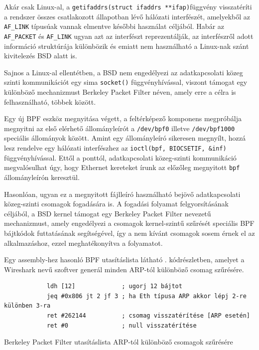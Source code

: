 \documentclass[a4paper,12pt]{article}
\begin{document}
	Akár csak Linux-al, a \texttt{getifaddrs(struct ifaddrs **ifap)}függvény visszatéríti a rendszer összes csatlakozott állapotban lévő hálózati interfészét, amelyekből az \texttt{AF_LINK} típusúak vannak elmentve későbbi használat céljából. Habár az \texttt{AF_PACKET} és \texttt{AF_LINK} ugyan azt az interfészt reprezentálják, az interfészről adott információ struktúrája különbözik és emiatt nem használható a Linux-nak szánt kivitelezés BSD alatt is.
	
	Sajnos a Linux-al ellentétben, a BSD nem engedélyezi az adatkapcsolati közeg szinti kommunikációt egy sima  \texttt{socket()} függvényhívással, viszont támogat egy különböző mechanizmust Berkeley Packet Filter néven, amely erre a célra is felhasználható, többek között.
	
	Egy új BPF eszköz megnyitása végett, a feltérképező komponens megpróbálja megnyitni az első elérhető állományleírót a \texttt{/dev/bpf0} illetve \texttt{/dev/bpf1000} speciális állományok között. Amint egy állományleíró sikeresen megnyílt, hozzá lesz rendelve egy hálózati interfészhez az \texttt{ioctl(bpf, BIOCSETIF, &inf)} függvényhívással. Ettől a ponttól, adatkapcsolati közeg-szinti kommunikáció megvalósulhat úgy, hogy Ethernet kereteket írunk az előzőleg megnyitott \texttt{bpf} állományleírón keresztül.
	
	Hasonlóan, ugyan ez a megnyitott fájlleíró használható bejövő adatkapcsolati közeg-szinti csomagok fogadására is. A fogadási folyamat felgyorsításának céljából, a BSD kernel támogat egy Berkeley Packet Filter nevezetű mechanizmust, amely engedélyezi a csomagok kernel-szintű szűrését speciális BPF bájtkódok futtatásának segítségével, így a nem kívánt csomagok sosem érnek el az alkalmazáshoz, ezzel meghatékonyítva a folyamatot.
	
	Egy assembly-hez hasonló BPF utasításlista látható \az{\ref{bpfasm}}. kódrészletben, amelyet a Wireshark nevű szoftver generál minden ARP-tól különböző csomag szűrésére.
	
	\begin{listing}[H]
		\begin{verbatim}
			ldh [12]             ; ugorj 12 bájtot
			jeq #0x806 jt 2 jf 3 ; ha Eth típusa ARP akkor lépj 2-re különben 3-ra
			ret #262144          ; csomag visszatérítése [ARP esetén]
			ret #0               ; null visszatérítése
		\end{verbatim}
		\caption{Berkeley Packet Filter utasításlista ARP-tól különböző csomagok szűrésére}
		\label{bpfasm}
	\end{listing}
	
\end{document}
